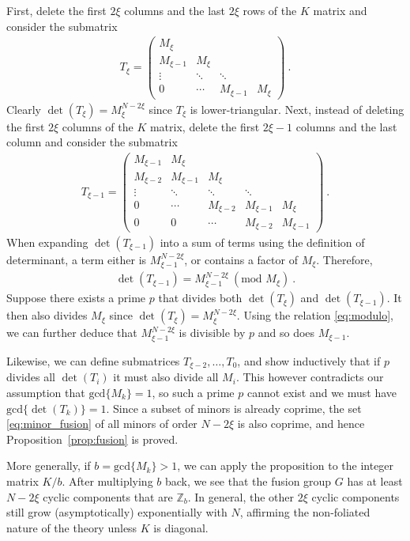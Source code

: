 \documentclass[aps,prb,twocolumn,superscriptaddress,floatfix,10pt,nofootinbib]{revtex4-2}
\newcommand{\ie}{\begin{equation}\begin{aligned}}
\newcommand{\fe}{\end{aligned}\end{equation}}
\theoremstyle{definition}
\begin{document}
First, delete the first $2\xi$ columns and the last $2\xi$ rows of the $K$ matrix and consider the submatrix
\ie
T_{\xi}=\begin{pmatrix}
M_\xi\\
M_{\xi-1} & M_\xi\\
\vdots & \ddots & \ddots\\
0 & \cdots & M_{\xi-1} & M_\xi
\end{pmatrix}~.
\fe
Clearly $\det(T_\xi)=M_\xi^{N-2\xi}$ since $T_\xi$ is lower-triangular. Next, instead of deleting the first $2\xi$ columns of the $K$ matrix, delete the first $2\xi-1$ columns and the last column and consider the submatrix
\ie
T_{\xi-1}=\begin{pmatrix}
M_{\xi-1} & M_\xi\\
M_{\xi-2} & M_{\xi-1} & M_\xi\\
\vdots & \ddots & \ddots & \ddots\\
0 & \cdots & M_{\xi-2} & M_{\xi-1} & M_\xi\\
0 & 0 & \cdots & M_{\xi-2} & M_{\xi-1}
\end{pmatrix}~.
\fe
When expanding $\det(T_{\xi-1})$ into a sum of terms using the definition of determinant, a term either is $M_{\xi-1}^{N-2\xi}$, or contains a factor of $M_\xi$. Therefore, 
\ie\label{eq:modulo}
\det(T_{\xi-1})=M_{\xi-1}^{N-2\xi}\ (\text{mod } M_\xi)~.
\fe
Suppose there exists a prime $p$ that divides both $\det(T_\xi)$ and $\det(T_{\xi-1})$. It then also divides $M_\xi$ since $\det(T_{\xi})=M_\xi^{N-2\xi}$. Using the relation \eqref{eq:modulo}, we can further deduce that $M_{\xi-1}^{N-2\xi}$ is divisible by $p$ and so does $M_{\xi-1}$.

Likewise, we can define submatrices $T_{\xi-2},\ldots,T_0$, and show inductively that if $p$ divides all $\det(T_i)$ it must also divide all $M_i$. This however contradicts our assumption that $\text{gcd}\{M_k\}=1$, so such a prime $p$ cannot exist and we must have $\text{gcd}\{\det(T_k)\}=1$. Since a subset of minors is already coprime, the set \eqref{eq:minor_fusion} of all minors of order $N-2\xi$ is also coprime, and hence Proposition~\ref{prop:fusion} is proved.

More generally, if $b=\text{gcd}\{M_k\}>1$, we can apply the proposition to the integer matrix $K/b$. After multiplying $b$ back, we see that the fusion group $G$ has at least $N-2\xi$ cyclic components that are $\mathbb{Z}_b$. In general, the other $2\xi$ cyclic components still grow (asymptotically) exponentially with $N$, affirming the non-foliated nature of the theory unless $K$ is diagonal.





\end{document}

